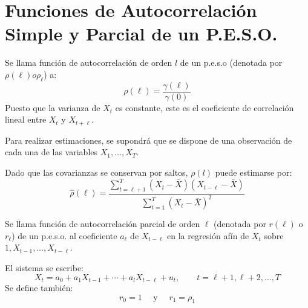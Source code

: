 \section{Funciones de Autocorrelaci\'{o}n Simple y Parcial de un P.E.S.O.}

\begin{definicion}
 Se llama funci\'{o}n de autocorrelaci\'{o}n de orden $l$ de un p.e.s.o (denotada por $\rho \left( \ell \right) o \rho_{\ell}$) a:
\[
\rho \left( \ell \right)=\frac{\gamma (\ell)}{\gamma (0)}
\]
Puesto que la varianza de $X_{t}$ es constante, este es el coeficiente de correlaci\'{o}n lineal entre $X_{t}$ y $X_{t+\ell}$.
\end{definicion}

\begin{observacion}
 Para realizar estimaciones, se supondr\'{a} que se dispone de una observaci\'{o}n de cada una de las variables $X_{1},\ldots, X_{T}$.\newline

Dado que las covarianzas se conservan por saltos, $\rho \left( l \right)$ puede estimarse por:
\[
\widehat{\rho }(\ell)=\frac{\displaystyle \sum_{t=\ell+1}^T (X_{t}-\bar{X})(X_{t-\ell}-\bar{X}) }{\displaystyle \sum_{t=1}^T (X_{t}-\bar{X})^{2} }
\]
\end{observacion}

\begin{definicion}
 Se llama funci\'{o}n de autocorrelaci\'{o}n parcial de orden $\ell$ (denotada por $r\left( \ell \right)$ o $r_{\ell}$) de un p.e.s.o. al coeficiente $a_{\ell}$ de $X_{t-\ell}$ en la regresi\'{o}n af\'{i}n de $X_{t}$ sobre $1, X_{t-1},\ldots, X_{t-\ell}$.
\end{definicion}

El sistema se escribe:
\[
X_{t}=a_{0}+a_{1}X_{t-1}+\cdots +a_{l}X_{t-\ell}+u_{t}, \qquad t=\ell+1, \ell+2,\ldots ,T
\]
Se define tambi\'{e}n:
\[
 r_{0} =1\quad\text{ y }\quad r_{1} =\rho_{1}
\]

